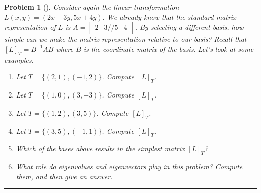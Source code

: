 \documentclass[letterpaper,oneside]{book}%
\theoremstyle{plain}
\theoremstyle{box}
\theoremstyle{problem}
\newtheorem{problemnum}{Problem}[chapter]
\newenvironment{problem}[1][]{\begin{problemnum}[#1]}{\end{problemnum}\nopagebreak\hrule\bigskip}
\newcommand{\bvec}[1]{\begin{bmatrix} #1 \end{bmatrix}}
\begin{document}
\begin{problem}
Consider again the linear transformation $L(x,y) = (2x+3y,5x+4y)$.  We already know that the standard matrix representation of $L$ is $A = \bvec{2&3//5&4}$. By selecting a different basis, how simple can we make the matrix representation relative to our basis?  Recall that $[L]_T = B^{-1}AB$ where $B$ is the coordinate matrix of the basis.  Let's look at some examples.
\begin{enumerate}
 \item Let $T=\{(2,1),(-1,2)\}$.  Compute $[L]_T$. 
 \item Let $T=\{(1,0),(3,-3)\}$.  Compute $[L]_T$. 
 \item Let $T=\{(1,2),(3,5)\}$.  Compute $[L]_T$. 
 \item Let $T=\{(3,5),(-1,1)\}$.  Compute $[L]_T$. 
 \item Which of the bases above results in the simplest matrix $[L]_T$?
 \item What role do eigenvalues and eigenvectors play in this problem? Compute them, and then give an answer. 
\end{enumerate}

\end{problem}
\end{document}
